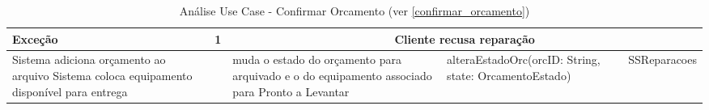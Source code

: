 \documentclass[../relatorio.tex]{subfiles}
\begin{document}
\begin{landscape}
\begin{table}[!h]
\begin{tabular}{|p{5cm}|p{1cm}|p{4cm}|p{6cm}|p{3cm}|}
            Exceção  & 1                                                 &  \multicolumn{3}{c}{Cliente recusa reparação}\\
            \hline
            Sistema adiciona orçamento ao arquivo
            Sistema coloca equipamento disponível para entrega
                     & 
                     & muda o estado do orçamento para arquivado e o do equipamento associado para Pronto a Levantar
                     & alteraEstadoOrc(orcID: String, state: OrcamentoEstado)
                     & SSReparacoes
            \\
            \hline
        \end{tabular}
        \caption{Análise Use Case - Confirmar Orcamento (ver \ref{confirmar_orcamento})}
    \end{table}
\end{landscape}
\end{document}
